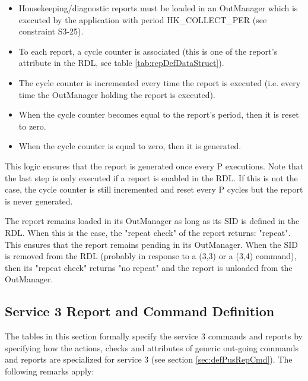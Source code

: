 \documentclass{pnp_article}
\begin{document}
\begin{itemize}
\item Housekeeping/diagnostic reports must be loaded in an OutManager which is executed by the application with period HK\_COLLECT\_PER (see constraint S3-25).
\item To each report, a cycle counter is associated (this is one of the report's attribute in the RDL, see table \ref{tab:repDefDataStruct}).
\item The cycle counter is incremented every time the report is executed (i.e. every time the OutManager holding the report is executed).
\item When the cycle counter becomes equal to the report's period, then it is reset to zero.
\item When the cycle counter is equal to zero, then it is generated.
\end{itemize}

This logic ensures that the report is generated once every P executions. Note that the last step is only executed if a report is enabled in the RDL. If this is not the case, the cycle counter is still incremented and reset every P cycles but the report is never generated.

The report remains loaded in its OutManager as long as its SID is defined in the RDL. When this is the case, the "repeat check" of the report returns: "repeat". This ensures that the report remains pending in its OutManager. When the SID is removed from the RDL (probably in response to a (3,3) or a (3,4) command), then its "repeat check" returns "no repeat" and the report is unloaded from the OutManager.


\subsection{Service 3 Report and Command Definition}\label{sec:serv3RepCmdDef}
The tables in this section formally specify the service 3 commands and reports by specifying how the actions, checks and attributes of generic out-going commands and reports are specialized for service 3 (see section \ref{sec:defPusRepCmd}). The following remarks apply:
\end{document}
